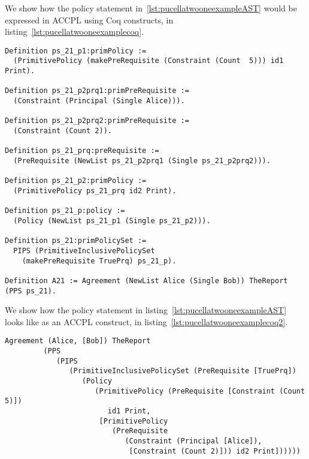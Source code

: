 We show how the policy statement in~\ref{lst:pucellatwooneexampleAST} would be expressed in \ac{ACCPL} using Coq constructs, in listing~\ref{lst:pucellatwooneexamplecoq}.

\begin{minipage}[c]{0.95\textwidth}
\begin{lstlisting}
Definition ps_21_p1:primPolicy := 
  (PrimitivePolicy (makePreRequisite (Constraint (Count  5))) id1 Print).

Definition ps_21_p2prq1:primPreRequisite := 
  (Constraint (Principal (Single Alice))).

Definition ps_21_p2prq2:primPreRequisite := 
  (Constraint (Count 2)).

Definition ps_21_prq:preRequisite := 
  (PreRequisite (NewList ps_21_p2prq1 (Single ps_21_p2prq2))).

Definition ps_21_p2:primPolicy := 
  (PrimitivePolicy ps_21_prq id2 Print).

Definition ps_21_p:policy := 
  (Policy (NewList ps_21_p1 (Single ps_21_p2))).

Definition ps_21:primPolicySet :=
  PIPS (PrimitiveInclusivePolicySet
    (makePreRequisite TruePrq) ps_21_p).

Definition A21 := Agreement (NewList Alice (Single Bob)) TheReport (PPS ps_21).
\end{lstlisting}
\end{minipage} 

We show how the policy statement in listing~\ref{lst:pucellatwooneexampleAST} looks like as an \ac{ACCPL} construct, in listing~\ref{lst:pucellatwooneexamplecoq2}.

\begin{minipage}[c]{0.95\textwidth}
\begin{lstlisting}
Agreement (Alice, [Bob]) TheReport
         (PPS
            (PIPS
               (PrimitiveInclusivePolicySet (PreRequisite [TruePrq])
                  (Policy
                     (PrimitivePolicy (PreRequisite [Constraint (Count 5)])
                        id1 Print,
                      [PrimitivePolicy
                         (PreRequisite
                            (Constraint (Principal [Alice]),
                             [Constraint (Count 2)])) id2 Print])))))

\end{lstlisting}
\end{minipage} 

